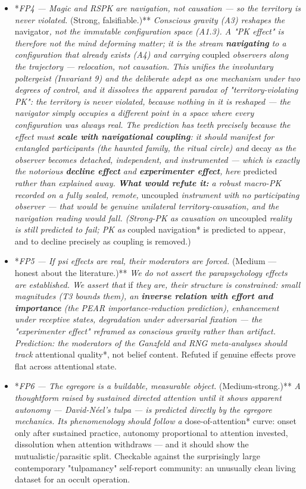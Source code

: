 \documentclass[11pt]{article}
\begin{document}
\begin{itemize}
\item *\emph{FP4 --- Magic and RSPK are navigation, not causation --- so the territory is never violated. }(Strong, falsifiable.)**\emph{ Conscious gravity (A3) reshapes the }navigator\emph{, not the immutable configuration space (A1.3). A "PK effect" is therefore not the mind deforming matter; it is the stream \textbf{navigating} to a configuration that already exists (A4) and carrying }coupled\emph{ observers along the trajectory --- relocation, not causation. This unifies the involuntary poltergeist (Invariant 9) and the deliberate adept as one mechanism under two degrees of control, and it dissolves the apparent paradox of "territory-violating PK": the territory is never violated, because nothing in it is reshaped --- the navigator simply occupies a different point in a space where every configuration was always real. The prediction has teeth precisely because the effect must \textbf{scale with navigational coupling}: it should manifest for entangled participants (the haunted family, the ritual circle) and }decay\emph{ as the observer becomes detached, independent, and instrumented --- which is exactly the notorious \textbf{decline effect} and \textbf{experimenter effect}, here }predicted\emph{ rather than explained away. \textbf{What would refute it:} a robust macro-PK recorded on a fully sealed, remote, }uncoupled\emph{ instrument with no participating observer --- that would be genuine unilateral territory-causation, and the navigation reading would fall. (Strong-PK as causation on }uncoupled\emph{ reality is still predicted to fail; PK as }coupled navigation* is predicted to appear, and to decline precisely as coupling is removed.)
\item *\emph{FP5 --- If psi effects are real, their moderators are forced. }(Medium --- honest about the literature.)**\emph{ We do not assert the parapsychology effects are established. We assert that }if\emph{ they are, their structure is constrained: small magnitudes (T3 bounds them), an \textbf{inverse relation with effort and importance} (the PEAR importance-reduction prediction), enhancement under receptive states, degradation under adversarial fixation --- the "experimenter effect" reframed as conscious gravity rather than artifact. Prediction: the moderators of the Ganzfeld and RNG meta-analyses should track }attentional quality*, not belief content. Refuted if genuine effects prove flat across attentional state.
\item *\emph{FP6 --- The egregore is a buildable, measurable object. }(Medium-strong.)**\emph{ A thoughtform raised by sustained directed attention until it shows apparent autonomy --- David-Néel's tulpa --- is predicted directly by the egregore mechanics. Its phenomenology should follow a }dose-of-attention* curve: onset only after sustained practice, autonomy proportional to attention invested, dissolution when attention withdraws --- and it should show the mutualistic/parasitic split. Checkable against the surprisingly large contemporary "tulpamancy" self-report community: an unusually clean living dataset for an occult operation.
\end{itemize}
\end{document}
